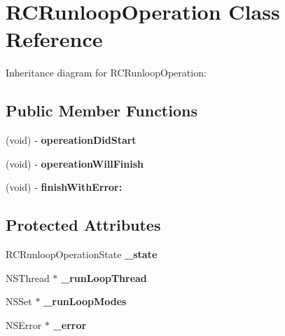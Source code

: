 \hypertarget{interface_r_c_runloop_operation}{\section{R\-C\-Runloop\-Operation Class Reference}
\label{interface_r_c_runloop_operation}
}


Inheritance diagram for R\-C\-Runloop\-Operation\-:
\subsection*{Public Member Functions}
\begin{DoxyCompactItemize}
\item 
\hypertarget{interface_r_c_runloop_operation_a2cb6658eaa22e6296539487fc6b48472}{(void) -\/ {\bfseries opereation\-Did\-Start}}\label{interface_r_c_runloop_operation_a2cb6658eaa22e6296539487fc6b48472}

\item 
\hypertarget{interface_r_c_runloop_operation_acdf530096f29b08c3318d130900c0a59}{(void) -\/ {\bfseries opereation\-Will\-Finish}}\label{interface_r_c_runloop_operation_acdf530096f29b08c3318d130900c0a59}

\item 
\hypertarget{interface_r_c_runloop_operation_ad783573732ca9fb1cd5f4340a478ccf2}{(void) -\/ {\bfseries finish\-With\-Error\-:}}\label{interface_r_c_runloop_operation_ad783573732ca9fb1cd5f4340a478ccf2}

\end{DoxyCompactItemize}
\subsection*{Protected Attributes}
\begin{DoxyCompactItemize}
\item 
\hypertarget{interface_r_c_runloop_operation_a47a6287d6c541968a3c5229d5291b352}{R\-C\-Runloop\-Operation\-State {\bfseries \-\_\-state}}\label{interface_r_c_runloop_operation_a47a6287d6c541968a3c5229d5291b352}

\item 
\hypertarget{interface_r_c_runloop_operation_ace567345d7bf371cd0771c7c986cda34}{N\-S\-Thread $\ast$ {\bfseries \-\_\-run\-Loop\-Thread}}\label{interface_r_c_runloop_operation_ace567345d7bf371cd0771c7c986cda34}

\item 
\hypertarget{interface_r_c_runloop_operation_aea60cb1cb0bee2ea6291342810509385}{N\-S\-Set $\ast$ {\bfseries \-\_\-run\-Loop\-Modes}}\label{interface_r_c_runloop_operation_aea60cb1cb0bee2ea6291342810509385}

\item 
\hypertarget{interface_r_c_runloop_operation_ac3145f8aebda67d751bdc0ae4da02dc4}{N\-S\-Error $\ast$ {\bfseries \-\_\-error}}\label{interface_r_c_runloop_operation_ac3145f8aebda67d751bdc0ae4da02dc4}

\end{DoxyCompactItemize}
